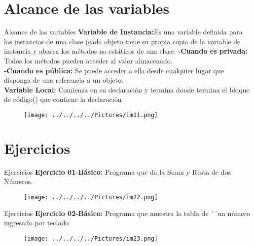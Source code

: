 \documentclass[11pt]{beamer}
\begin{document}
	\section{Alcance de las variables
}
		\begin{frame}{Alcance de las variables
}
			\justifying
		\textbf{Variable de Instancia:}Es una variable definida para las instancias de una clase (cada objeto tiene su propia copia de la variable de instancia y abarca los métodos no estáticos de una clase.
		\vfill \textbf{    -Cuando es privada:} Todos los métodos pueden acceder al valor almacenado.\\
		\vfill \textbf{    -Cuando es pública:} Se puede acceder a ella desde cualquier lugar que disponga de una referencia a un objeto.\\

			\vfill
	       \textbf{Variable Local:} Comienza en su declaración y termina donde termina el bloque de código({}) que contiene la declaración

\begin{figure}[H]
				\centering
				\texttt{[image: ../../../../Pictures/im11.png]}
			\end{figure}
		\end{frame}
		
		
		\section{Ejercicios}
	\begin{frame}{Ejercicios
}
			\justifying
			\textbf{Ejercicio 01-Básico: }Programa que da la Suma y Resta de dos Números. 
			\begin{figure}[hbtp]
		\centering
		\texttt{[image: ../../../../Pictures/im22.png]}
		\end{figure}
		\end{frame}
		\begin{frame}{Ejercicios
}
			\justifying
			\textbf{Ejercicio 02-Básico: }Programa que muestra la tabla de ´´un número ingresado por teclado
			\begin{figure}[hbtp]
		\centering
		\texttt{[image: ../../../../Pictures/im23.png]}
		\end{figure}
		\end{frame}
		
\end{document}
